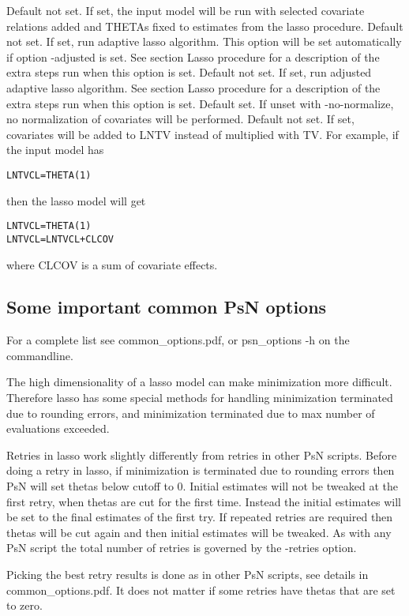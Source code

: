 \begin{optionlist}
\nextopt
{}
Default not set. If set, the input model will be run with selected covariate
relations added and THETAs fixed to estimates from the lasso procedure.
\nextopt
{}
Default not set. If set, run adaptive lasso algorithm. This option will be set automatically if option -adjusted is set.
See section Lasso procedure for a description of the extra steps run when this option is set.
\nextopt
{}
Default not set. If set, run adjusted adaptive lasso algorithm. See section Lasso procedure for a
description of the extra steps run when this option is set.
\nextopt
{}
Default set. If unset with -no-normalize, no normalization of covariates will
be performed.
\nextopt
{}
Default not set. If set, covariates will be added to LNTV instead
of multiplied with TV. For example, if the input model has
\begin{verbatim}
LNTVCL=THETA(1)
\end{verbatim}
then the lasso model will get
\begin{verbatim}
LNTVCL=THETA(1)
LNTVCL=LNTVCL+CLCOV
\end{verbatim}
where CLCOV is a sum of covariate effects.
\nextopt
\end{optionlist}

\subsection{Some important common PsN options}
For a complete list see common\_options.pdf, 
or psn\_options -h on the commandline.

The high dimensionality of a lasso model can make minimization more difficult. Therefore lasso has some special methods for handling minimization terminated due to rounding errors, and minimization terminated due to max number of evaluations exceeded.

Retries in lasso work slightly differently from retries in other PsN scripts. Before doing a retry in lasso, if minimization is terminated due to rounding errors then PsN will set thetas below cutoff to 0. Initial estimates will not be tweaked at the first retry, when thetas are cut for the first time. Instead the initial estimates will be set to the final estimates of the first try. If repeated retries are required then thetas will be cut again and then initial estimates will be tweaked. As with any PsN script the total number of retries is governed by the -retries option. 

Picking the best retry results is done as in other PsN scripts, see details 
in common\_options.pdf. It does not matter if some retries have thetas that are set to zero.

